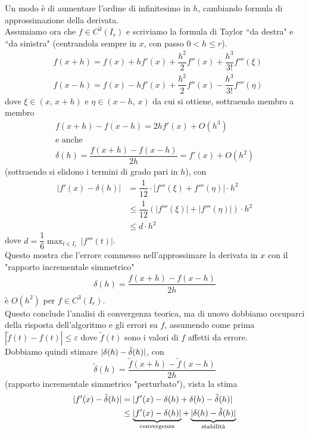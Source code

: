 \documentclass[12pt,a4paper]{article}
\DeclarePairedDelimiter{\abs}{\lvert}{\rvert}
\begin{document}
Un modo è di aumentare l'ordine di infinitesimo in $h$, cambiando formula di approssimazione della derivata.\\
Assumiamo ora che $f\in C^3(I_r)$ e scriviamo la formula di Taylor ``da destra" e ``da sinistra" (centrandola sempre in $x$, con passo $0<h\leq r$).
\[ \begin{split}
	& f(x+h)=f(x)+hf'(x)+\dfrac{h^2}{2}f''(x)+\dfrac{h^3}{3!}f'''(\xi) \\
	& f(x-h)=f(x)-hf'(x)+\dfrac{h^2}{2}f''(x)-\dfrac{h^3}{3!}f'''(\eta)
\end{split} \]
dove $\xi \in (x, \, x+h)$ e $\eta \in (x-h, \, x)$ da cui si ottiene, sottraendo membro a membro
\begin{gather*}
	f(x+h)-f(x-h)=2hf'(x)+O(h^3)\\
	\text{e anche}\\
	\delta (h) = \dfrac{f(x+h)-f(x-h)}{2h} = f'(x) + O(h^2)
\end{gather*} 
(sottraendo si elidono i termini di grado pari in $h$), con
\[ \begin{split}
	|f'(x)-\delta(h)|& =\dfrac{1}{12}\cdot |f'''(\xi)+f'''(\eta)|\cdot h^2 \\
	& \leq \dfrac{1}{12}\left( |f'''(\xi)| + |f'''(\eta)| \right) \cdot h^2 \\
	& \leq d\cdot h^2
\end{split} \]
dove $d=\dfrac{1}{6} \max_{t \in I_r} \, |f'''(t)|$.\\
Questo mostra che l'errore
commesso nell'approssimare la derivata in $x$ con il "rapporto incrementale simmetrico"
\[ \begin{split}
	\delta (h) = \dfrac{f(x+h)-f(x-h)}{2h}
\end{split} \]
è $O(h^2)$ per $f \in C^3(I_r)$.\\
Questo conclude l'analisi di convergenza teorica, ma di nuovo dobbiamo occuparci della risposta dell'algoritmo e gli errori su $f$, assumendo come prima $|\widetilde{f}(t)-f(t)| \leq \varepsilon$ dove $\widetilde{f}(t)$ sono i valori di $f$ affetti da errore.\\
Dobbiamo quindi stimare $\abs{\delta(h) - \tilde{\delta}(h)}$, con
\[
\tilde{\delta}(h) = \frac{\tilde{f}(x+h) - \tilde{f}(x-h)}{2h}
\]
(rapporto incrementale simmetrico "perturbato"), vista la stima
\[
\begin{split}
    \abs{f'(x) - \tilde{\delta}(h)} & = \abs{f'(x) - \delta(h) + \delta(h) - \tilde{\delta}(h)} \\
    & \le \underbrace{\abs{f'(x) - \delta(h)}}_{\text{convergenza}} + \underbrace{\abs{\delta(h) - \tilde{\delta}(h)}}_{\text{stabilità}}
\end{split}
\]
\end{document}

